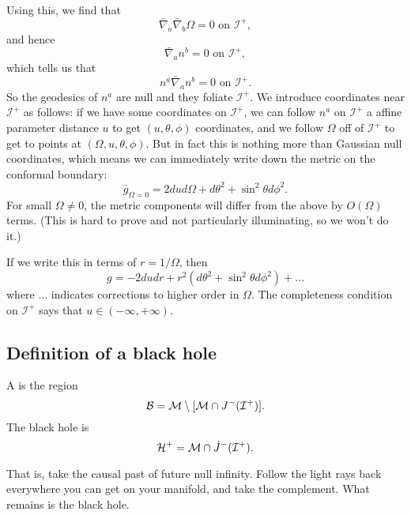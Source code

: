 Using this, we find that
\begin{equation}
    \bar \nabla_a \bar \nabla_b \Omega =0 \text{ on }\mathcal{I}^+,
\end{equation}
and hence
\begin{equation}
    \bar \nabla_a n^b = 0 \text{ on }\mathcal{I}^+,
\end{equation}
which tells us that
\begin{equation}
    n^a \bar \nabla_a n^b = 0\text{ on }\mathcal{I}^+.
\end{equation}
So the geodesics of $n^a$ are null and they foliate $\mathcal{I}^+$. We introduce coordinates near $\mathcal{I}^+$ as follows: if we have some coordinates on $\mathcal{I}^+$, we can follow $n^a$ on $\mathcal{I}^+$ a affine parameter distance $u$ to get $(u,\theta,\phi)$ coordinates, and we follow $\Omega$ off of $\mathcal{I}^+$ to get to points at $(\Omega, u,\theta,\phi)$. But in fact this is nothing more than Gaussian null coordinates, which means we can immediately write down the metric on the conformal boundary:
\begin{equation}
    \bar g_{\Omega=0} =2du d\Omega +d\theta^2 +\sin^2\theta d\phi^2.
\end{equation}
For small $\Omega \neq 0$, the metric components will differ from the above by $O(\Omega)$ terms. (This is hard to prove and not particularly illuminating, so we won't do it.)

If we write this in terms of $r=1/\Omega$, then
\begin{equation}
    g= -2du dr + r^2 (d\theta^2+\sin^2\theta d\phi^2)+\ldots
\end{equation}
where $\ldots$ indicates corrections to higher order in $\Omega$. The completeness condition on $\mathcal{I}^+$ says that $u\in (-\infty,+\infty)$.

\subsection*{Definition of a black hole}
\begin{defn}
    A  is the region
    \begin{equation}
        \mathcal{B}=\mathcal{M} \setminus [\mathcal{M} \cap J^-(\mathcal{I}^+)].
    \end{equation}
    The black hole  is
    \begin{equation}
        \mathcal H^+ = \mathcal{M} \cap \dot J^{-}(\mathcal{I}^+).
    \end{equation}
\end{defn}
That is, take the causal past of future null infinity. Follow the light rays back everywhere you can get on your manifold, and take the complement. What remains is the black hole.